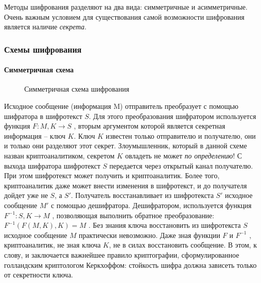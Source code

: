 Методы шифрования разделяют на два вида: симметричные и асимметричные. Очень важным условием для существования самой возможности шифрования является наличие \emph{секрета}.


\begin{frame}
\frametitle{Схемы шифрования}
\framesubtitle{Симметричная схема}
\begin{figure}
    \begin{center}
    \end{center}
    \caption{Симметричная схема шифрования}\label{pict:symmcipher}
\end{figure} 
\end{frame}


Исходное сообщение (информация M) отправитель преобразует с помощью шифратора в шифротекст $S$. Для этого преобразования шифратором используется функция $F:M,K\rightarrow S$ , вторым аргументом которой является секретная информация – ключ $K$. Ключ $K$ известен только отправителю и получателю, они и только они  разделяют этот секрет. Злоумышленник, который в данной схеме назван криптоаналитиком, секретом $K$ овладеть не может \emph{по определению}! С выхода шифратора шифротекст $S$ передается через открытый канал получателю. При этом шифротекст может получить и криптоаналитик. Более того, криптоаналитик даже может внести изменения в шифротекст, и до получателя дойдет уже не $S$, а $S'$.  Получатель  восстанавливает из шифротекста $S'$ исходное сообщение $M'$ с помощью дешифратора. Дешифратором, используется функция $F^{-1}:S,K\rightarrow M$ , позволяющая выполнить обратное преобразование: $F^{-1}(F(M,K),K)=M$ . Без знания ключа восстановить из шифротекста $S$ исходное сообщение $M$ практически невозможно. Даже зная функции $F$  и $F^{-1}$ , криптоаналитик, не зная ключа $K$, не в силах восстановить сообщение. В этом, к слову, и заключается важнейшее правило криптографии, сформулированное голландским криптологом Керкхоффом: стойкость шифра должна зависеть только от секретности ключа.

